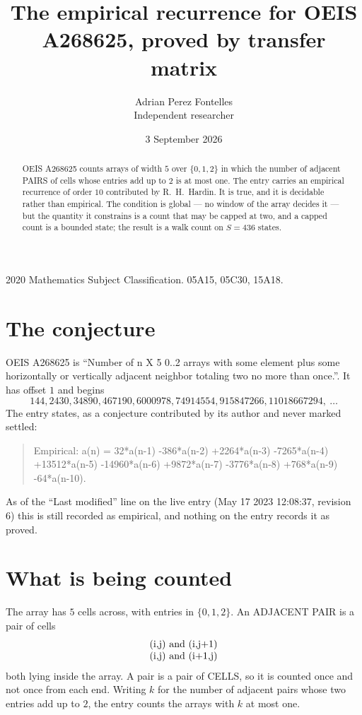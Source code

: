 \documentclass[11pt,a4paper]{article}
\title{The empirical recurrence for OEIS A268625, proved by transfer matrix}
\author{Adrian Perez Fontelles\\ \small Independent researcher}
\date{3 September 2026}
\theoremstyle{plain}
\theoremstyle{definition}
\begin{document}
\maketitle

\begin{abstract}
OEIS A268625 counts arrays of width $5$ over $\{0,1,2\}$ in which the number of adjacent PAIRS of
cells whose entries add up to $2$ is at most one. The entry carries an empirical recurrence of
order $10$ contributed by R.~H.~Hardin. It is true, and it is decidable rather than
empirical. The condition is global --- no window of the array decides it --- but the quantity
it constrains is a count that may be capped at two, and a capped count is a bounded state; the
result is a walk count on $S=436$ states.
\end{abstract}

\noindent\small 2020 Mathematics Subject Classification. 05A15, 05C30, 15A18.\normalsize

\section{The conjecture}

OEIS A268625 is ``Number of n X 5 0..2 arrays with some element plus some horizontally or vertically adjacent neighbor totaling two no more than once.''. It has offset $1$ and begins
\[
144, 2430, 34890, 467190, 6000978, 74914554, 915847266, 11018667294,\ \dots
\]
The entry states, as a conjecture contributed by its author and never marked settled:
\begin{quote}
Empirical: a(n) = 32*a(n-1) -386*a(n-2) +2264*a(n-3) -7265*a(n-4) +13512*a(n-5) -14960*a(n-6) +9872*a(n-7) -3776*a(n-8) +768*a(n-9) -64*a(n-10).
\end{quote}
As of the ``Last modified'' line on the live entry (May 17 2023 12:08:37, revision 6) this is still
recorded as empirical, and nothing on the entry records it as proved.

\section{What is being counted}

The array has $5$ cells across, with entries in $\{0,1,2\}$. An ADJACENT PAIR is a pair of cells
\[
\begin{array}{l}
$(i,j)\text{ and }(i,j{+}1)$ \\
$(i,j)\text{ and }(i{+}1,j)$ \\
\end{array}
\]
both lying inside the array. A pair is a pair of CELLS, so it is counted once and not once from
each end. Writing $k$ for the number of adjacent pairs whose two entries add up to $2$, the
entry counts the arrays with $k$ at most one.
\end{document}
